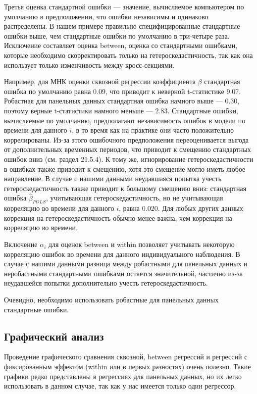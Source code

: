 Третья оценка стандартной ошибки  --- значение, вычисляемое компьютером по умолчанию в предположении, что ошибки независимы и одинаково распределены. В нашем примере правильно специфицированные стандартные ошибки выше, чем стандартные ошибки по умолчанию в три-четыре раза. Исключение составляет оценка between, оценка со стандартными ошибками, которые необходимо скорректировать только на гетероскедастичность, так как она использует только изменчивость между кросс-секциями. 

Например, для МНК оценки сквозной регрессии коэффициента $\beta$ стандартная ошибка по умолчанию равна 0.09, что приводит к неверной t-статистике 9.07. Робастная для панельных данных стандартная ошибка намного выше --- 0.30, поэтому верные t-статистики намного меньше --- 2.83. Стандартные ошибки, вычисляемые по умолчанию, предполагают независимость ошибок в модели по времени для данного $i$, в то время как на практике они часто положительно коррелированы. Из-за этого ошибочного предположения переоценивается выгода от дополнительных временных периодов, что приводит к смещению стандартных ошибок вниз (см. раздел 21.5.4). К тому же, игнорирование гетероскедастичности в ошибках также приводит к смещению, хотя это смещение могло иметь любое направление. В случае с нашими данными неудавшаяся попытка учесть гетероскедастичность также приводит к большому смещению вниз: стандартная ошибка $\hat{\beta}_{POLS}$, учитывающая гетероскедастичность, но не учитывающая корреляцию во времени для данного $i$, равна 0.020. Для любых других данных коррекция на гетероскедастичность обычно менее важна, чем коррекция на корреляцию во времени. 

Включение $\alpha_i$ для оценок between и within позволяет учитывать некоторую корреляцию ошибок во времени для данного индивидуального наблюдения. В случае с нашими данными разница между робастными для панельных данных и неробастными стандартными ошибками остается значительной, частично из-за неудавшейся попытки дополнительно учесть гетероскедастичность.

Очевидно, необходимо использовать робастные для панельных данных стандартные ошибки. 

\subsection{Графический анализ}

Проведение графического сравнения сквозной, between регрессий и регрессий с фиксированным эффектом (within или в первых разностях) очень полезно. Такие графики редко представлены в регрессиях для панельных данных, но их легко использовать в данном случае, так как у нас имеется только один регрессор.

